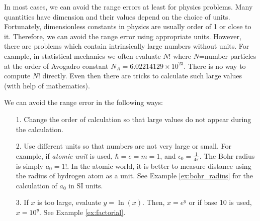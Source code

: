 In most cases, we can avoid the range errors at least for physics problems.
Many quantities have dimension and their values depend on the choice of units. Fortunately, dimensionless constants in physics are usually order of 1 or close to it. Therefore, we can avoid the range error using appropriate units.
However, there are problems which contain intrinsically large numbers without units.  For example, in statistical mechanics we often evaluate $N!$ where $N$=number particles at the order of Avogadro constant $N_A=6.02214129 \times 10^{23}$.  There is no way to compute $N!$ directly.  Even then there are tricks to calculate such large values (with help of mathematics).

We can avoid the range error in the following ways:

\begin{center}
\begin{minipage}{5in}
\begin{itemize}
\item[1.] Change the order of calculation so that large values do not appear during the calculation.
\item[2.] Use different units so that numbers are not very large or small.
For example, if \textit{atomic unit} is used, $\hbar=e=m=1$, and $\epsilon_0 = \frac{1}{4\pi}$.  The Bohr radius is simply $a_0=1$!.  In the atomic world, it is better to measure distance using the radius of hydrogen atom as a unit.  See Example \ref{ex:bohr_radius} for the calculation of $a_0$ in SI units.
\item[3.] If $x$ is too large, evaluate $y=\ln(x)$.   Then, $x=e^y$ or if base 10 is used, $x=10^y$. See Example \ref{ex:factorial}.
\end{itemize}
\end{minipage}
\end{center}

